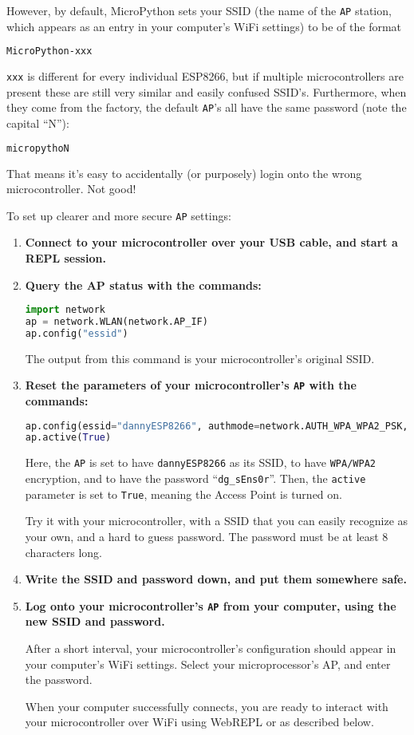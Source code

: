 However, by default, MicroPython sets your SSID (the name of the \texttt{AP} station, which appears as an entry in your computer's WiFi settings) to be of the format
\begin{lstlisting}[language=bash]
MicroPython-xxx
\end{lstlisting}
\verb|xxx| is different for every individual ESP8266, but if multiple microcontrollers are present these are still very similar and easily confused SSID's. 
Furthermore, when they come from the factory, the default \texttt{AP}'s all have the same password (note the capital ``N''): 
\begin{lstlisting}[language=bash]
micropythoN
\end{lstlisting}
That means it's easy to accidentally (or purposely) login onto the wrong microcontroller.
Not good!

To set up clearer and more secure \texttt{AP} settings:
\begin{enumerate}
	\item \textbf{Connect to your microcontroller over your USB cable, and start a REPL session.} 
	\item \textbf{Query the AP status with the commands:}
\begin{lstlisting}[language=Python]
import network
ap = network.WLAN(network.AP_IF)
ap.config("essid")
\end{lstlisting}
	The output from this command is your microcontroller's original SSID.

	\item \textbf{Reset the parameters of your microcontroller's \texttt{AP} with the commands:}
\begin{lstlisting}[language=Python]
ap.config(essid="dannyESP8266", authmode=network.AUTH_WPA_WPA2_PSK, password="dg_sEns0r")
ap.active(True)
\end{lstlisting}
	Here, the \texttt{AP} is set to have \verb|dannyESP8266| as its SSID, to have \texttt{WPA/WPA2} encryption, and to have the password ``\verb|dg_sEns0r|''.
	Then, the \texttt{active} parameter is set to \lstinline|True|, meaning the Access Point is turned on. 
	
	Try it with your microcontroller, with a SSID that you can easily recognize as your own, and a hard to guess password.
	The password must be at least 8 characters long.
	 
	\item \textbf{Write the SSID and password down, and put them somewhere safe.}	
	
	\item \textbf{Log onto your microcontroller's \texttt{AP} from your computer, using the new SSID and password.}

	After a short interval, your microcontroller's configuration should appear in your computer's WiFi settings.
	Select your microprocessor's AP, and enter the password. 
	
	When your computer successfully connects, you are ready to interact with your microcontroller over WiFi using WebREPL or \mpfshell as described below.	
\end{enumerate}

